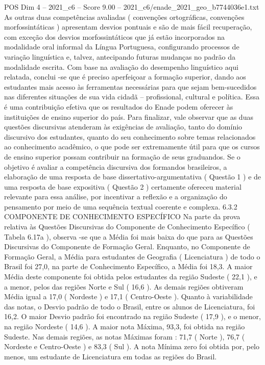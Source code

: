 \begin{textsample}{POS Dim 4 – 2021\_c6 – Score 9.00 – 2021\_c6/enade\_2021\_geo\_b7744036e1.txt}
As outras duas competências avaliadas ( convenções ortográficas, convenções morfossintáticas ) apresentam desvios pontuais e são de mais fácil recuperação, com exceção dos desvios morfossintáticos que já estão incorporados na modalidade oral informal da Língua Portuguesa, configurando processos de variação linguística e, talvez, antecipando futuras mudanças no padrão da modalidade escrita.
Com base na avaliação do desempenho linguístico aqui relatada, conclui -se que é preciso aperfeiçoar a formação superior, dando aos estudantes mais acesso às ferramentas necessárias para que sejam bem-sucedidos nas diferentes situações de sua vida cidadã – profissional, cultural e política.
Essa é uma contribuição efetiva que os resultados do Enade podem oferecer às instituições de ensino superior do país.
Para finalizar, vale observar que as duas questões discursivas atenderam às exigências de avaliação, tanto do domínio discursivo dos estudantes, quanto do seu conhecimento sobre temas relacionados ao conhecimento acadêmico, o que pode ser extremamente útil para que os cursos de ensino superior possam contribuir na formação de seus graduandos.
Se o objetivo é avaliar a competência discursiva dos formandos brasileiros, a elaboração de uma resposta de base dissertativo-argumentativa ( Questão 1 ) e de uma resposta de base expositiva ( Questão 2 ) certamente ofereceu material relevante para essa análise, por incentivar a reflexão e a organização do pensamento por meio de uma sequência textual coerente e complexa. 6.3.2 COMPONENTE DE CONHECIMENTO ESPECÍFICO Na parte da prova relativa às Questões Discursivas do Componente de Conhecimento Específico ( Tabela 6.17a ), observa -se que a Média foi mais baixa do que para as Questões Discursivas do Componente de Formação Geral.
Enquanto, no Componente de Formação Geral, a Média para estudantes de Geografia ( Licenciatura ) de todo o Brasil foi 27,0, na parte de Conhecimento Específico, a Média foi 18,3.
A maior Média deste componente foi obtida pelos estudantes da região Sudeste ( 22,1 ), e a menor, pelos das regiões Norte e Sul ( 16,6 ).
As demais regiões obtiveram Média igual a 17,0 ( Nordeste ) e 17,1 ( Centro-Oeste ).
Quanto à variabilidade das notas, o Desvio padrão de todo o Brasil, entre os alunos de Licenciatura, foi 16,2.
O maior Desvio padrão foi encontrado na região Sudeste ( 17,9 ), e o menor, na região Nordeste ( 14,6 ).
A maior nota Máxima, 93,3, foi obtida na região Sudeste.
Nas demais regiões, as notas Máximas foram : 71,7 ( Norte ), 76,7 ( Nordeste e Centro-Oeste ) e 83,3 ( Sul ).
A nota Mínima zero foi obtida por, pelo menos, um estudante de Licenciatura em todas as regiões do Brasil.

\end{textsample}
